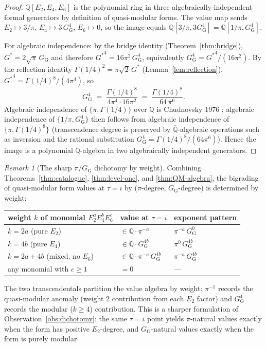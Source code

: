 \documentclass[11pt]{article}
\theoremstyle{definition}
\theoremstyle{remark}
\newtheorem*{remark}{Remark}
\newcommand{\Gs}{G^{*}}
\newcommand{\GG}{G_{\!\scriptscriptstyle\mathrm{G}}}
\newcommand{\Q}{\mathbb{Q}}
\begin{document}
\begin{proof}
$\Q[E_2, E_4, E_6]$ is the polynomial ring in three algebraically-independent
formal generators by definition of quasi-modular forms. The value map sends
$E_2 \mapsto 3/\pi$, $E_4 \mapsto 3\,\GG^4$, $E_6 \mapsto 0$, so the image equals
$\Q[3/\pi, 3\GG^4] = \Q[1/\pi, \GG^4]$.

For algebraic independence: by the bridge identity (Theorem~\ref{thm:bridge}),
$\Gs = 2\sqrt\pi\,\GG$ and therefore ${\Gs}^{4} = 16\pi^{2}\,\GG^{4}$, equivalently
$\GG^{4} = {\Gs}^{4}/(16\pi^{2})$. By the reflection identity
$\Gamma(1/4)^{2} = \pi\sqrt 2\,\Gs$ (Lemma~\ref{lem:reflection}),
${\Gs}^{4} = \Gamma(1/4)^{8}/(4\pi^{4})$, so
\[
\GG^{4} \;=\; \frac{\Gamma(1/4)^{8}}{4\pi^{4}\cdot 16\pi^{2}}
        \;=\; \frac{\Gamma(1/4)^{8}}{64\,\pi^{6}}.
\]
Algebraic independence of $\{\pi, \Gamma(1/4)\}$ over $\Q$ is Chudnovsky 1976
\cite{chudnovsky1976}; algebraic independence of $\{1/\pi, \GG^{4}\}$ then follows
from algebraic independence of $\{\pi, \Gamma(1/4)^{8}\}$ (transcendence degree
is preserved by $\overline{\Q}$-algebraic operations such as inversion and the
rational substitution $\GG^{4} = \Gamma(1/4)^{8}/(64\pi^{6})$). Hence the
image is a polynomial $\Q$-algebra in two algebraically independent
generators.
\end{proof}

\begin{remark}[The sharp $\pi$/$\GG$ dichotomy by weight]\label{rem:weight-dichotomy}
Combining Theorems~\ref{thm:catalogue}, \ref{thm:level-one}, and \ref{thm:QM-algebra},
the bigrading of quasi-modular form values at $\tau = i$ by ($\pi$-degree,
$\GG$-degree) is determined by weight:
\begin{center}
\begin{tabular}{l@{\qquad}l@{\qquad}l}
\toprule
weight $k$ of monomial $E_2^a E_4^b E_6^c$ & value at $\tau=i$ & exponent pattern \\
\midrule
$k = 2a$ \;(pure $E_2$)                            & $\in \Q\cdot\pi^{-a}$               & $\pi^{-a}\,\GG^{0}$ \\
$k = 4b$ \;(pure $E_4$)                            & $\in \Q\cdot \GG^{4b}$              & $\pi^{0}\,\GG^{4b}$ \\
$k = 2a + 4b$ \;(mixed, no $E_6$)                  & $\in \Q\cdot\pi^{-a}\,\GG^{4b}$     & $\pi^{-a}\,\GG^{4b}$ \\
\;\;any monomial with $c \geq 1$\;\;               & $= 0$                               & --- \\
\bottomrule
\end{tabular}
\end{center}
The two transcendentals partition the value algebra by weight: $\pi^{-1}$ records
the quasi-modular anomaly (weight 2 contribution from each $E_2$ factor) and
$\GG^4$ records the modular ($k \geq 4$) contribution. This is a sharper
formulation of Observation~\ref{obs:dichotomy}: the same $\tau = i$ point yields
$\pi$-natural values exactly when the form has positive $E_2$-degree, and
$\GG$-natural values exactly when the form is purely modular.
\end{remark}
\end{document}
